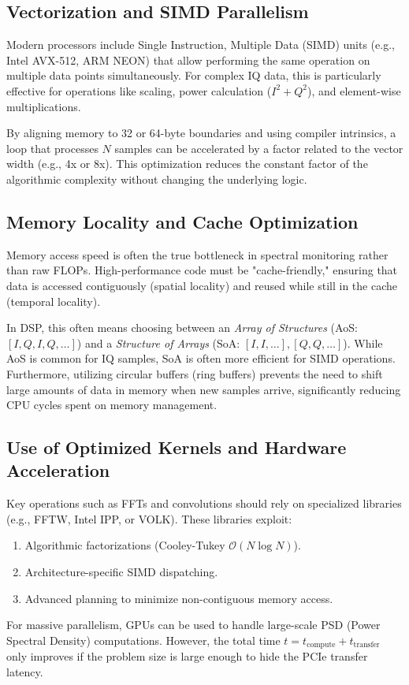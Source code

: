 \documentclass[11pt]{article}
\begin{document}
\subsection{Vectorization and SIMD Parallelism}
Modern processors include Single Instruction, Multiple Data (SIMD) units (e.g., Intel AVX-512, ARM NEON) that allow performing the same operation on multiple data points simultaneously. For complex IQ data, this is particularly effective for operations like scaling, power calculation ($I^2 + Q^2$), and element-wise multiplications.

By aligning memory to 32 or 64-byte boundaries and using compiler intrinsics, a loop that processes $N$ samples can be accelerated by a factor related to the vector width (e.g., 4x or 8x). This optimization reduces the constant factor of the algorithmic complexity without changing the underlying logic.

\subsection{Memory Locality and Cache Optimization}
Memory access speed is often the true bottleneck in spectral monitoring rather than raw FLOPs. High-performance code must be "cache-friendly," ensuring that data is accessed contiguously (spatial locality) and reused while still in the cache (temporal locality).

In DSP, this often means choosing between an \emph{Array of Structures} (AoS: $[I, Q, I, Q, \dots]$) and a \emph{Structure of Arrays} (SoA: $[I, I, \dots], [Q, Q, \dots]$). While AoS is common for IQ samples, SoA is often more efficient for SIMD operations. Furthermore, utilizing circular buffers (ring buffers) prevents the need to shift large amounts of data in memory when new samples arrive, significantly reducing CPU cycles spent on memory management.

\subsection{Use of Optimized Kernels and Hardware Acceleration}
Key operations such as FFTs and convolutions should rely on specialized libraries (e.g., FFTW, Intel IPP, or VOLK). These libraries exploit:
\begin{enumerate}
    \item Algorithmic factorizations (Cooley-Tukey $\mathcal{O}(N \log N)$).
    \item Architecture-specific SIMD dispatching.
    \item Advanced planning to minimize non-contiguous memory access.
\end{enumerate}
For massive parallelism, GPUs can be used to handle large-scale PSD (Power Spectral Density) computations. However, the total time $t = t_{\text{compute}} + t_{\text{transfer}}$ only improves if the problem size is large enough to hide the PCIe transfer latency.
\end{document}

